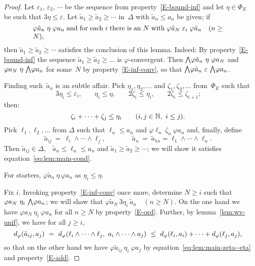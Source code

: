 \documentclass[main.tex]{subfiles}
\begin{document}
\begin{proof}
Let $\varepsilon_1,\,\varepsilon_2,\,\cdots$ be the
sequence from property~\ref{E-bound-inf}
and let $\eta \in \Phi_E$ be such that $3\eta \leq \varepsilon$.
Let $\tilde a_1 \geq \tilde a_2 \geq \dotsb$
in~$\Delta$ with $\tilde a_n \leq a_n$ be given; if
\begin{equation}
\label{eq:lem:main-cond}
\begin{minipage}{0.8\textwidth}
$\varphi\tilde a_n \ \eta\ \varphi a_n$ and
 for each~$i$ there is an~$N$ with
$\varphi \tilde a_N \ \varepsilon_i\  \varphi \tilde a_n \quad (n\geq N)$,
\end{minipage}
\end{equation}
then $\tilde a_1 \geq \tilde a_2 \geq \dotsb$
satisfies the conclusion of this lemma.
Indeed:
By property~\ref{E-bound-inf} the sequence
 $\tilde a_1 \geq \tilde a_2 \geq \dotsc$
is $\varphi$-convergent. 
Then $\textstyle{\bigwedge}\varphi \tilde a_n\ \eta\ \varphi a_N$ 
and $\varphi a_N\ \eta\ \textstyle{\bigwedge}\varphi a_n$ 
for some~$N$ by property~\ref{E-inf-conv},
so that $\textstyle{\bigwedge} \varphi \tilde a_n \ \varepsilon\ \textstyle{\bigwedge}\varphi a_n$.

Finding such~$\tilde a_n$ is an subtle affair.
Pick $\eta_1, \eta_2,\dotsc$ and $\zeta_1,\zeta_2,\dotsc$
from~$\Phi_E$ such that
\begin{equation*}
3 \eta_i \leq \varepsilon_i\text{,} \qquad
\eta_i \leq \eta\text{,} \qquad
2\zeta_i \leq \eta_i\text{,} \qquad
2\zeta_i \leq \zeta_{i+1}\text{;}
\end{equation*}
then:
\begin{equation}
\label{eq:lem:main-zeta--eta}
\zeta_i + \dotsb + \zeta_j \leq \eta_i \qquad (i,j\in\mathbb{N},\  i\leq j)\text{.}
\end{equation}
Pick $\ell_1,\ell_2,\dotsc$ from $\Delta$ 
such that $\ell_n \leq a_n$ and $\varphi\ell_n\ \zeta_n\  \varphi a_n$
and, finally, define 
\begin{equation*}
\tilde{a}_{ij} \ =\ \ell_i \wedge \dotsb\wedge \ell_j\text{,}
\qquad\qquad
\tilde{a}_n \ =\ \tilde{a}_{1n} =\ell_1 \wedge\dotsb\wedge \ell_n\text{.}
\end{equation*}
Then $\tilde a_{ij} \in \Delta$,\ \  $\tilde a_n \leq \ell_n \leq a_n$
and $\tilde a_1 \geq \tilde a_2 \geq \dotsb$;
we will show it satisfies equation~\eqref{eq:lem:main-cond}.

For starters, $\varphi \tilde a_n \ \eta \ \varphi a_n$
as $\eta_i \leq \eta$.

Fix $i$.  
Invoking property~\ref{E-inf-conv} once more,
determine $N\geq i$ such that $\varphi a_N \ \eta_i \ \textstyle{\bigwedge} \varphi a_n$;
we will show that $\varphi\tilde a_N \ 3\eta_i \ \tilde a_n\quad (n\geq N)$.
On the one hand we have $\varphi a_N \ \eta_i\ \varphi a_n$ 
for all $n\geq N$ by property~\ref{E-ord}.
Further,
by lemma~\ref{lem:wv-unif},
we have for all $j\geq i$,
\begin{equation*}
\ld\varphi(\tilde a_{ij},a_j)\ =\ 
\ld\varphi(\ell_i \wedge\dotsb\wedge \ell_j,\  a_i \wedge \dotsb \wedge a_j)
\ \leq\ \ld\varphi(\ell_i,a_i)+\dotsb+\ld\varphi(\ell_j,a_j)\text{,}
\end{equation*}
so that 
on the other hand we have
 $\varphi\tilde a_{ij} \ \eta_i\ \varphi a_j$
by equation~\eqref{eq:lem:main-zeta--eta} and property~\ref{E-add}.


\end{proof}
\end{document}
